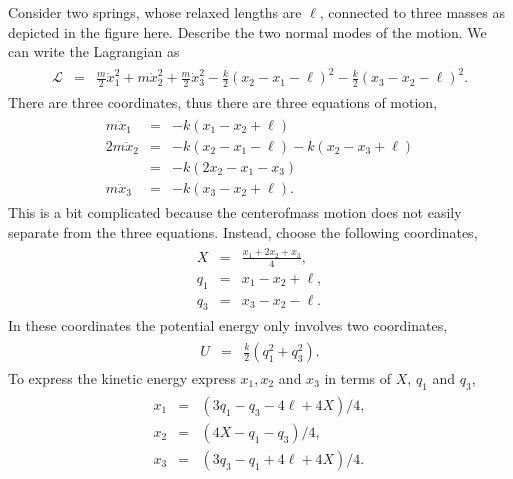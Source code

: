 \documentclass[letterpaper,10pt,english]{sphinxmanual}
\begin{document}
Consider two springs, whose relaxed lengths are \(\ell\), connected to three masses as depicted in the figure here. Describe the two normal modes of the motion. We can write the Lagrangian as
\begin{equation*}
\begin{split}
\begin{eqnarray*}
\mathcal{L}&=&\frac{m}{2}\dot{x}_1^2+m\dot{x}_2^2+\frac{m}{2}\dot{x}_3^2
-\frac{k}{2}(x_2-x_1-\ell)^2-\frac{k}{2}(x_3-x_2-\ell)^2.
\end{eqnarray*}
\end{split}
\end{equation*}
There are three coordinates, thus there are three equations of motion,
\begin{equation*}
\begin{split}
\begin{eqnarray*}
m\ddot{x}_1&=&-k(x_1-x_2+\ell)\\
2m\ddot{x}_2&=&-k(x_2-x_1-\ell)-k(x_2-x_3+\ell)\\
&=&-k(2x_2-x_1-x_3)\\
m\ddot{x}_3&=&-k(x_3-x_2+\ell).
\end{eqnarray*}
\end{split}
\end{equation*}
This is a bit complicated because the center\sphinxhyphen{}of\sphinxhyphen{}mass motion does not easily separate from the three equations. Instead, choose the following coordinates,
\begin{equation*}
\begin{split}
\begin{eqnarray*}
X&=&\frac{x_1+2x_2+x_3}{4},\\
q_1&=&x_1-x_2+\ell,\\
q_3&=&x_3-x_2-\ell.
\end{eqnarray*}
\end{split}
\end{equation*}
In these coordinates the potential energy only involves two coordinates,
\begin{equation*}
\begin{split}
\begin{eqnarray*}
U&=&\frac{k}{2}(q_1^2+q_3^2).
\end{eqnarray*}
\end{split}
\end{equation*}
To express the kinetic energy express \(x_1, x_2\) and \(x_3\) in terms of
\(X\), \(q_1\) and \(q_3\),
\begin{equation*}
\begin{split}
\begin{eqnarray*}
x_1&=&(3q_1-q_3-4\ell+4X)/4,\\
x_2&=&(4X-q_1-q_3)/4,\\
x_3&=&(3q_3-q_1+4\ell+4X)/4.
\end{eqnarray*}
\end{split}
\end{equation*}
\end{document}
